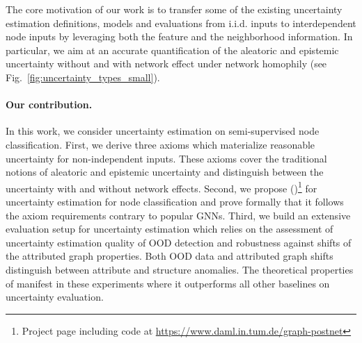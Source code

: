 The core motivation of our work is to transfer some of the existing uncertainty estimation definitions, models and evaluations from i.i.d. inputs to interdependent node inputs by leveraging both the feature and the neighborhood information. In particular, we aim at an accurate quantification of the aleatoric and epistemic uncertainty without and with network effect under network homophily (see Fig.~\ref{fig:uncertainty_types_small}).

\paragraph{Our contribution.} In this work, we consider uncertainty estimation on semi-supervised node classification. First, we derive three axioms which materialize reasonable uncertainty for non-independent inputs. These axioms cover the traditional notions of aleatoric and epistemic uncertainty and distinguish between the uncertainty with and without network effects. Second, we propose \GPN{} (\GPNacro{})\footnote{Project page including code at \url{https://www.daml.in.tum.de/graph-postnet}} for uncertainty estimation for node classification and prove formally that it follows the axiom requirements contrary to popular GNNs. Third, we build an extensive evaluation setup for uncertainty estimation which relies on the assessment of uncertainty estimation quality of OOD detection and robustness against shifts of the attributed graph properties. Both OOD data and attributed graph shifts distinguish between attribute and structure anomalies. The theoretical properties of \GPNacro{} manifest in these experiments where it outperforms all other baselines on uncertainty evaluation.

